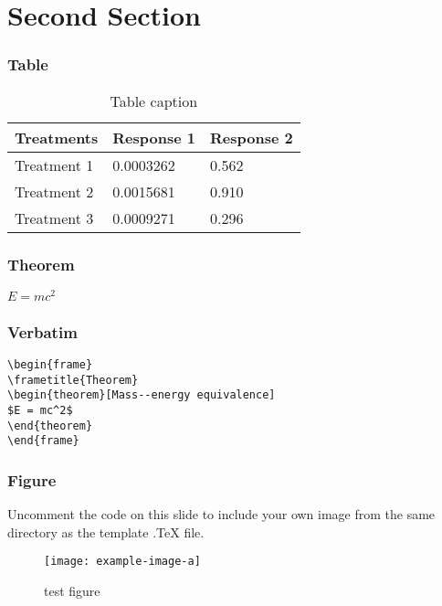 \documentclass{beamer}
\begin{document}
\section{Second Section}

\begin{frame}
\frametitle{Table}
\begin{table}
\begin{tabular}{l l l}
\toprule
\textbf{Treatments} & \textbf{Response 1} & \textbf{Response 2}\\
\midrule
Treatment 1 & 0.0003262 & 0.562 \\
Treatment 2 & 0.0015681 & 0.910 \\
Treatment 3 & 0.0009271 & 0.296 \\
\bottomrule
\end{tabular}
\caption{Table caption}
\end{table}
\end{frame}


\begin{frame}
\frametitle{Theorem}
\begin{theorem}
$E = mc^2$
\end{theorem}
\end{frame}


\begin{frame}[fragile] %
\frametitle{Verbatim}
\begin{example}
\begin{verbatim}
\begin{frame}
\frametitle{Theorem}
\begin{theorem}[Mass--energy equivalence]
$E = mc^2$
\end{theorem}
\end{frame}\end{verbatim}
\end{example}
\end{frame}


\begin{frame}
\frametitle{Figure}
Uncomment the code on this slide to include your own image from the same directory as the template .TeX file.
\begin{figure}
\texttt{[image: example-image-a]}
\caption{test figure}
\end{figure}
\end{frame}
\end{document}
